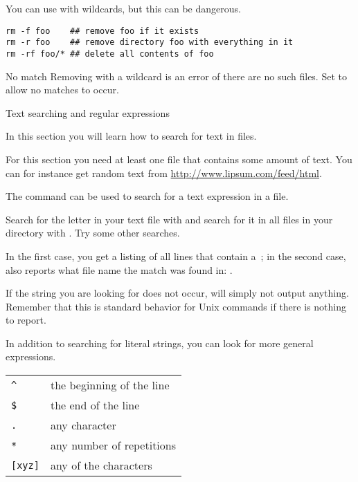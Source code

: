 You can use  with wildcards, but this can be dangerous.
\begin{verbatim}
rm -f foo    ## remove foo if it exists
rm -r foo    ## remove directory foo with everything in it
rm -rf foo/* ## delete all contents of foo
\end{verbatim}

\begin{zshnote}{No match}
  Removing with a wildcard 
  is an error of there are no such files.
  Set  to allow no matches to occur.
\end{zshnote}

 {Text searching and regular expressions}
\label{sec:regexp}

\begin{purpose}
  In this section you will learn how to search for text in files.
\end{purpose}

For this section you need at least one file that contains some amount
of text. You can for instance get random text from
\url{http://www.lipsum.com/feed/html}. 

The  command can be used to search for a text expression in a
file.

\begin{exercise}
  Search for the letter  in your text file with  and search for it in all files in your directory with
  . Try some other searches.
\end{exercise}
\begin{outcome}
  In the first case, you get a listing of all lines that contain
  a~; in the second case,  also reports what file name
  the match was found in: .
\end{outcome}
\begin{caution}
  If the string you are looking for does not occur,  will
    simply not output anything. Remember that this is standard behavior
    for Unix commands if there is nothing to report.
\end{caution}

In addition to searching for literal strings, you can look for more
general expressions.

\begin{tabular}{ll} 
  \toprule
  \verb+^+&the beginning of the line\\
  \verb+$+&the end of the line\\
  \verb+.+&any character\\
  \verb+*+&any number of repetitions \\
  \verb+[xyz]+&any of the characters \n{xyz}\\
  \bottomrule
\end{tabular}

